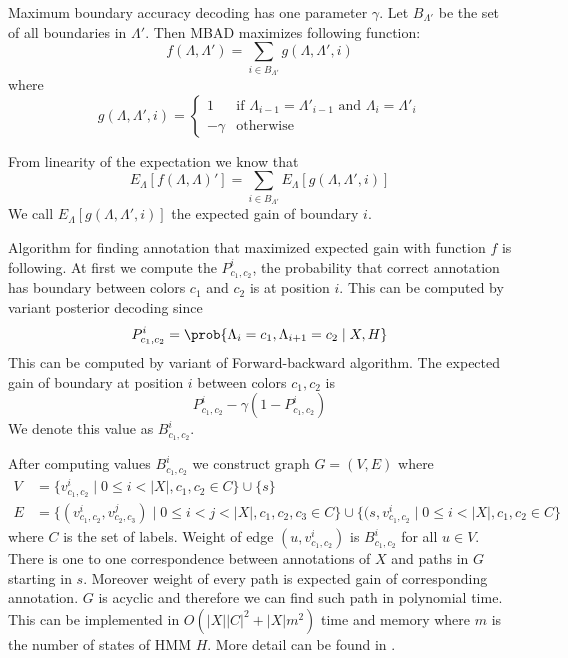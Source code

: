 Maximum boundary accuracy decoding has one parameter $\gamma$. Let $B_{\Lambda'}$ be the
set of all boundaries in $\Lambda'$. Then MBAD maximizes following function:
\begin{equation}
f(\Lambda,\Lambda')=\sum_{i\in B_{\Lambda'}}g(\Lambda,\Lambda',i)
\end{equation}
where 
\begin{equation}
g(\Lambda,\Lambda',i)=
\begin{cases}
1 & \text{if $\Lambda_{i-1}=\Lambda'_{i-1}$ and $\Lambda_{i}=\Lambda'_{i}$}\\
-\gamma& \text{otherwise}
\end{cases}
\end{equation}

From linearity of the expectation we know that
\[E_{\Lambda}[f(\Lambda,\Lambda)']=\sum_{i\in
B_{\Lambda'}}E_{\Lambda}[g(\Lambda,\Lambda',i)]\] We call
$E_{\Lambda}[g(\Lambda,\Lambda',i)]$ the expected gain of boundary $i$.


Algorithm for finding annotation that maximized expected gain with function $f$
is following. At first we compute the $P^i_{c_1,c_2}$, the probability that correct annotation
has boundary between colors $c_1$ and $c_2$ is at position $i$. This can be computed by variant posterior decoding
since 
\[P_{c_1,c_2}^i=\prob{\Lambda_i=c_1,\Lambda_{i+1}=c_2\mid X,H}\]  
This
can be computed by variant of Forward-backward algorithm.  The expected gain of
boundary at position $i$ between colors $c_1,c_2$  is 
\[P^i_{c_1,c_2}-\gamma (1-P^i_{c_1,c_2})\]
We denote this value as  $B^i_{c_1,c_2}$.

After computing values $B^i_{c_1,c_2}$ we construct graph $G=(V,E)$ where
\begin{align*}
V&=\{v^i_{c_1,c_2}\mid 0\leq i<|X|,c_1,c_2\in C\}\cup\{s\}\\
E&=\{(v^i_{c_1,c_2},v^j_{c_2,c_3})\mid 0\leq i<j< |X|, c_1,c_2,c_3\in C
\}\cup\{(s,v^i_{c_1,c_2}\mid 0\leq i< |X|, c_1,c_2\in C\} 
\end{align*}
where $C$ is the set
of labels. Weight of edge $(u,v^i_{c_1,c_2})$ is $B^i_{c_1,c_2}$ for all $u\in
V$. There is one to one correspondence between annotations of $X$ and paths in
$G$ starting in $s$. Moreover weight of every path is expected gain of
corresponding annotation. $G$ is acyclic and therefore we can find such path in
polynomial time. This can be implemented in $O(|X||C|^2+|X|m^2)$ time and memory
where $m$ is the number of states of HMM $H$. More detail can be found in
\cite{Nanasi2010mgr}.

